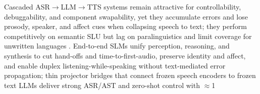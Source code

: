 \documentclass{article}
\begin{document}
Cascaded ASR$\rightarrow$LLM$\rightarrow$TTS systems remain attractive for controllability, debuggability, and component swapability, yet they accumulate errors and lose prosody, speaker, and affect cues when collapsing speech to text; they perform competitively on semantic SLU but lag on paralinguistics and limit coverage for unwritten languages \cite{huang2023holisticcascadesystembenchmarkhumanevalu,huang2025dynamicsuperbphase2collaborativelyexpand}. End-to-end SLMs unify perception, reasoning, and synthesis to cut hand-offs and time-to-first-audio, preserve identity and affect, and enable duplex listening-while-speaking without text-mediated error propagation; thin projector bridges that connect frozen speech encoders to frozen text LLMs deliver strong ASR/AST and zero-shot control with $\approx$1%

\end{document}
